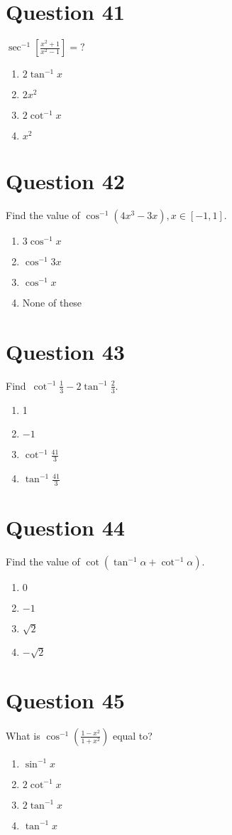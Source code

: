 \documentclass{article}
\begin{document}
\section*{Question 41}
\(\sec ^{-1}\left[\frac{x^{2}+1}{x^{2}-1}\right]=?\)
\begin{enumerate}[label=(\alph*)]
\item \(2 \tan ^{-1} x\)
\item \(2 x^{2}\)
\item \(2 \cot ^{-1} x\)
\item \(x^{2}\)
\end{enumerate}
\newpage
\section*{Question 42}
Find the value of \(\cos ^{-1}\left(4 x^3-3 x\right), x \in[-1,1]\).
\begin{enumerate}[label=(\alph*)]
\item \(3 \cos ^{-1} x\)
\item \(\cos ^{-1} 3 x\)
\item \(\cos ^{-1} x\)
\item None of these
\end{enumerate}
\newpage
\section*{Question 43}
Find \(\cot ^{-1} \frac{1}{3}-2 \tan ^{-1} \frac{2}{3}\).
\begin{enumerate}[label=(\alph*)]
\item 1
\item \(-1\)
\item \(\cot ^{-1} \frac{41}{3}\)
\item \(\tan ^{-1} \frac{41}{3}\)
\end{enumerate}
\newpage
\section*{Question 44}
Find the value of \(\cot \left(\tan ^{-1} \alpha+\cot ^{-1} \alpha\right)\).
\begin{enumerate}[label=(\alph*)]
\item \(0\)
\item \(-1\)
\item \(\sqrt{2}\)
\item \(-\sqrt{2}\)
\end{enumerate}
\newpage
\section*{Question 45}
What is \(\cos ^{-1}\left(\frac{1-x^{2}}{1+x^{2}}\right)\) equal to?
\begin{enumerate}[label=(\alph*)]
\item \(\sin ^{-1} x\)\newline
\item \(2 \cot ^{-1} x\)
\item \(2 \tan ^{-1} x\)
\item \(\tan ^{-1} x\)
\end{enumerate}
\newpage
\end{document}
